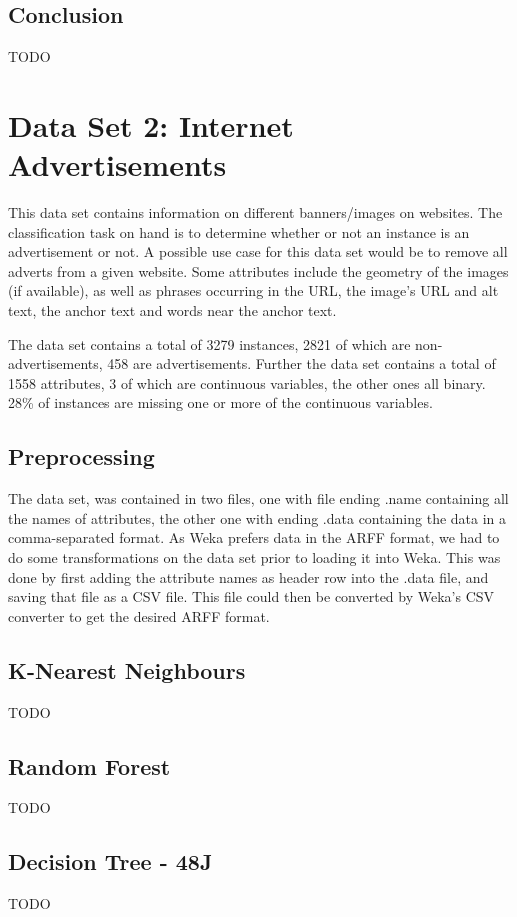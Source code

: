 \documentclass{sig-alternate-05-2015}
\begin{document}
\subsection{Conclusion}
TODO\\


\section{Data Set 2: Internet Advertisements}
This data set contains information on different banners/images on websites. The classification task on hand is to determine whether or not an instance is an advertisement or not. A possible use case for this data set would be to remove all adverts from a given website. Some attributes include the geometry of the images (if available), as well as phrases occurring in the URL, the image's URL and alt text, the anchor text and words near the anchor text.

The data set contains a total of 3279 instances, 2821 of which are non-advertisements, 458 are advertisements. Further the data set contains a total of 1558 attributes, 3 of which are continuous variables, the other ones all binary. 28\% of instances are missing one or more of the continuous variables.


\subsection{Preprocessing}
The data set, was contained in two files, one with file ending .name containing all the names of attributes, the other one with ending .data containing the data in a comma-separated format. As Weka prefers data in the ARFF format, we had to do some transformations on the data set prior to loading it into Weka. This was done by first adding the attribute names as header row into the .data file, and saving that file as a CSV file. This file could then be converted by Weka's CSV converter to get the desired ARFF format.

\subsection{K-Nearest Neighbours}
TODO\\
\subsection{Random Forest}
TODO\\
\subsection{Decision Tree - 48J}
TODO\\
\end{document}
